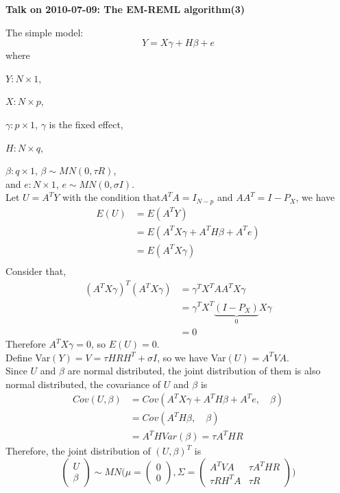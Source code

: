 \documentclass[12pt]{article}
\begin{document}
    \begin{center}
        {\bf Talk on 2010-07-09: The EM-REML algorithm(3)}
    \end{center}
    The simple model:
    \begin{equation*}
        Y=X\gamma+H\beta+e
    \end{equation*}
    where

    $Y:N\times 1$,

    $X:N\times p$,

    $\gamma:p\times 1$, $\gamma$ is the fixed effect,

    $H:N\times q$,

    $\beta:q\times 1$, $\beta\sim MN(0,\tau R)$, \\
    and $e:N\times1$, $e\sim MN(0,\sigma I)$.\\
    Let $U=A^TY$ with the condition that$A^TA=I_{N-p}$ and $AA^T=I-P_X$, we have
    \begin{align*}
        E(U)&=E(A^TY)\\
        &=E(A^TX\gamma+A^TH\beta+A^Te)\\
        &=E(A^TX\gamma)\\
    \end{align*}
    Consider that,
    \begin{align*}
        (A^TX\gamma)^T(A^TX\gamma)&=\gamma^TX^TAA^TX\gamma\\
        &=\gamma^TX^T\underbrace{(I-P_X)}_{0}X\gamma\\
        &=0
    \end{align*}
    Therefore $A^TX\gamma=0$, so $E(U)=0$.\\
    Define Var$(Y)=V=\tau HRH^T+\sigma I$, so we have Var$(U)=A^TVA$.\\
    Since $U$ and $\beta$ are normal distributed, the joint distribution of them is also normal distributed, the covariance of $U$ and $\beta$ is
     \begin{equation*}
     \begin{split}
        Cov(U,\beta)&=Cov(A^TX\gamma+A^TH\beta+A^Te,\quad \beta)\\
        &=Cov(A^TH\beta,\quad \beta)\\
        &=A^THVar(\beta)=\tau A^THR
     \end{split}
    \end{equation*}
    Therefore, the joint distribution of $(U,\beta)^T$ is
    \begin{equation*}
    \begin{pmatrix}
    U\\
    \beta
    \end{pmatrix}
    \sim MN\Big( \mu=\begin{pmatrix}
    0\\
    0
    \end{pmatrix}
    ,\Sigma=\begin{pmatrix}
    A^TVA&\tau A^THR\\
    \tau RH^TA&\tau R
    \end{pmatrix}
    \Big)
    \end{equation*}
\end{document}
